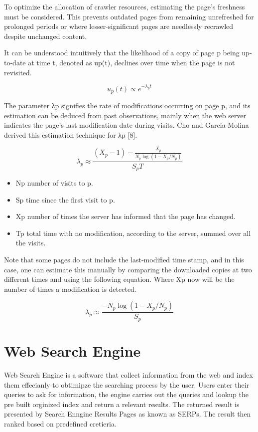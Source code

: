 To optimize the allocation of crawler resources, estimating the page's freshness must be considered. This prevents outdated pages from remaining unrefreshed for prolonged periods or where lesser-significant pages are needlessly recrawled despite unchanged content.


It can be understood intuitively that the likelihood of a copy of page p being up-to-date at time t, denoted as up(t), declines over time when the page is not revisited.

\begin{equation}
u_p(t) \propto e^{-\lambda_pt}
\label{eq:depth}
\end{equation}

The parameter λp signifies the rate of modifications occurring on page p, and its estimation can be deduced from past observations, mainly when the web server indicates the page's last modification date during visits. Cho and Garcia-Molina derived this estimation technique for λp [8].

\begin{equation}
\lambda_p \approx \frac{(X_p-1) - \frac{X_p}{N_p\log(1-X_p/N_p)}}{S_pT}
\label{eq:depth}
\end{equation}

\begin{itemize}
  \item Np number of visits to p.  
  \item Sp time since the first visit to p.
\item Xp number of times the server has informed that the page has changed.
\item Tp total time with no modification, according to the server, summed over all the visits.
\end{itemize}

Note that some pages do not include the last-modified time stamp, and in this case, one can estimate this manually by comparing the
downloaded copies at two different times and using the following equation. Where Xp now will be the number of times a modification is detected.

\begin{equation}
\lambda_p \approx \frac{-N_p\log(1-X_p/N_p)}{S_p}
\label{eq:depth}
\end{equation}

\section{Web Search Engine}
Web Search Engine is a software that collect information from the web and index them effecianly to obtimipze the searching process by the user. Users enter their queries to ask for information, the engine carries out the queries and lookup the pre built orginized index and return a relevant results. The returned result is presented by Search Enngine Results Pages as known as SERPs. The result then ranked based on predefined cretieria. 

